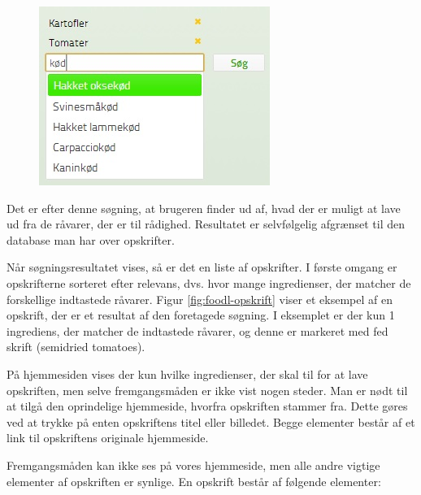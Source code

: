 \begin{figure}[H]
	\centering
	\includegraphics[scale=0.7]{billeder/foodl/soegefelt.jpg}
	\label{fig:foodl-soegefelt}
\end{figure}

Det er efter denne søgning, at brugeren finder ud af, hvad der er muligt at lave ud fra de råvarer, der er til rådighed. Resultatet er selvfølgelig afgrænset til den database man har over opskrifter.

Når søgningsresultatet vises, så er det en liste af opskrifter. I første omgang er opskrifterne sorteret efter relevans, dvs. hvor mange ingredienser, der matcher de forskellige indtastede råvarer. Figur \ref{fig:foodl-opskrift} viser et eksempel af en opskrift, der er et resultat af den foretagede søgning. I eksemplet er der kun 1 ingrediens, der matcher de indtastede råvarer, og denne er markeret med fed skrift (semidried tomatoes).

På hjemmesiden vises der kun hvilke ingredienser, der skal til for at lave opskriften, men selve fremgangsmåden er ikke vist nogen steder. Man er nødt til at tilgå den oprindelige hjemmeside, hvorfra opskriften stammer fra. Dette gøres ved at trykke på enten opskriftens titel eller billedet. Begge elementer består af et link til opskriftens originale hjemmeside. 

Fremgangsmåden kan ikke ses på vores hjemmeside, men alle andre vigtige elementer af opskriften er synlige. En opskrift består af følgende elementer:

